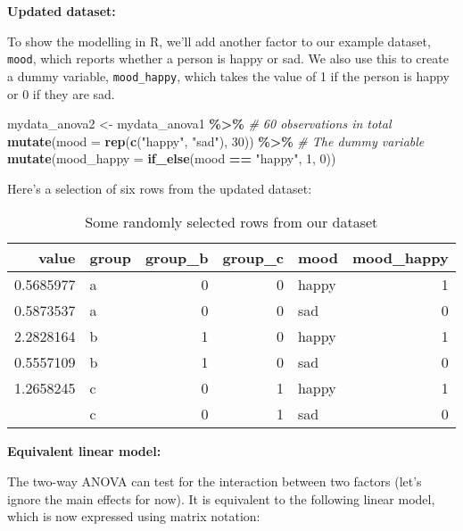 \documentclass[
  12pt,
]{krantz}
\newenvironment{Shaded}{\begin{snugshade}}{\end{snugshade}}
\newcommand{\CommentTok}[1]{\textcolor[rgb]{0.56,0.35,0.01}{\textit{#1}}}
\newcommand{\DataTypeTok}[1]{\textcolor[rgb]{0.13,0.29,0.53}{#1}}
\newcommand{\DecValTok}[1]{\textcolor[rgb]{0.00,0.00,0.81}{#1}}
\newcommand{\KeywordTok}[1]{\textcolor[rgb]{0.13,0.29,0.53}{\textbf{#1}}}
\newcommand{\NormalTok}[1]{#1}
\newcommand{\OperatorTok}[1]{\textcolor[rgb]{0.81,0.36,0.00}{\textbf{#1}}}
\newcommand{\StringTok}[1]{\textcolor[rgb]{0.31,0.60,0.02}{#1}}
\begin{document}
\textbf{Updated dataset:}

To show the modelling in R, we'll add another factor to our example dataset, \texttt{mood}, which reports whether a person is happy or sad. We also use this to create a dummy variable, \texttt{mood\_happy}, which takes the value of 1 if the person is happy or 0 if they are sad.

\begin{Shaded}
\begin{Highlighting}[]
\NormalTok{mydata\_anova2 \textless{}{-}}\StringTok{ }\NormalTok{mydata\_anova1 }\OperatorTok{\%\textgreater{}\%}
\StringTok{  }\CommentTok{\# 60 observations in total}
\StringTok{  }\KeywordTok{mutate}\NormalTok{(}\DataTypeTok{mood =} \KeywordTok{rep}\NormalTok{(}\KeywordTok{c}\NormalTok{(}\StringTok{"happy"}\NormalTok{, }\StringTok{"sad"}\NormalTok{), }\DecValTok{30}\NormalTok{)) }\OperatorTok{\%\textgreater{}\%}\StringTok{ }
\StringTok{  }\CommentTok{\# The dummy variable}
\StringTok{  }\KeywordTok{mutate}\NormalTok{(}\DataTypeTok{mood\_happy =} \KeywordTok{if\_else}\NormalTok{(mood }\OperatorTok{==}\StringTok{ "happy"}\NormalTok{, }\DecValTok{1}\NormalTok{, }\DecValTok{0}\NormalTok{))}
\end{Highlighting}
\end{Shaded}

Here's a selection of six rows from the updated dataset:

\begin{table}

\caption{\label{tab:unnamed-chunk-44}Some randomly selected rows from our dataset}
\centering
\begin{tabular}[t]{rlrrlr}
\toprule
value & group & group\_b & group\_c & mood & mood\_happy\\
\midrule
0.5685977 & a & 0 & 0 & happy & 1\\
0.5873537 & a & 0 & 0 & sad & 0\\
2.2828164 & b & 1 & 0 & happy & 1\\
0.5557109 & b & 1 & 0 & sad & 0\\
1.2658245 & c & 0 & 1 & happy & 1\\
\addlinespace
0.1858697 & c & 0 & 1 & sad & 0\\
\bottomrule
\end{tabular}
\end{table}

\textbf{Equivalent linear model:}

The two-way ANOVA can test for the interaction between two factors (let's ignore the main effects for now). It is equivalent to the following linear model, which is now expressed using matrix notation:
\end{document}
